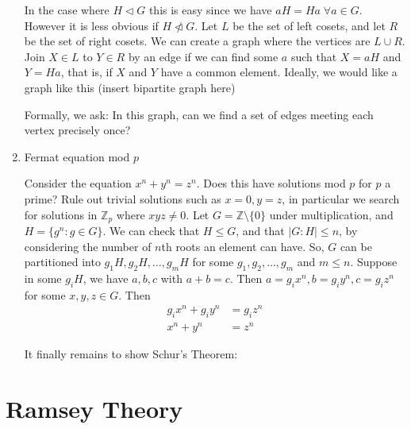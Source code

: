 \documentclass{article}
\begin{document}
\begin{eg}
\begin{enumerate}[label=\arabic*.]
            In the case where $H \lhd G$ this is easy since we have $a H = H a \; \forall a \in G$.  However it is less obvious if $H \ntriangleleft G$.
            Let $L$ be the set of left cosets, and let $R$ be the set of right cosets. We can create a graph where the vertices are $L \cup R$.
            Join $X \in L$ to $Y \in R$ by an edge if we can find some $a$ such that $X = aH$ and $Y = Ha$, that is, if $X$ and $Y$ have a common element.  Ideally, we would like a graph like this
            (insert bipartite graph here)

            Formally, we ask: In this graph, can we find a set of edges meeting each vertex precisely once?

        \item Fermat equation mod $p$

            Consider the equation $x^n + y^n = z^n$. Does this have solutions mod $p$ for $p$ a prime?  Rule out trivial solutions such as $x = 0, y = z$, in particular we search for solutions in $\mathbb{Z}_p$ where $xyz \ne 0$.
            Let $G = \mathbb{Z} \setminus \{0\}$ under multiplication, and $H = \{g^n : g \in G\}$.  We can check that $H \leq G$, and that $|G : H| \leq n$, by considering the number of $n$th roots an element can have.
            So, $G$ can be partitioned into $g_1 H, g_2 H, \dots, g_mH$ for some $g_1, g_2, \dots, g_m$ and $m \leq n$.  Suppose in some $g_i H$, we have $a, b, c$ with $a + b = c$.  Then $a = g_i x^n, b = g_i y^n, c = g_i z^n$ for some $x, y, z \in G$.  Then
            \begin{align*}
              g_i x^n + g_i y^n &= g_i z^n \\
              x^n + y^n &= z^n
            \end{align*}

            It finally remains to show Schur's Theorem:
    \end{enumerate}
\end{eg}

\clearpage
\section{Ramsey Theory}
\end{document}
